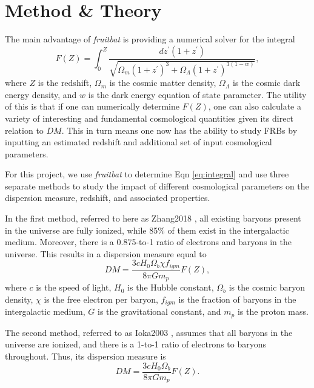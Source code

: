 \documentclass{article}
\begin{document}
\section{Method \& Theory}

The main advantage of {\it fruitbat} is providing a numerical solver for the integral
\begin{equation}
F(Z) = \int_0^Z \frac{dz^{\prime}(1 + z ^\prime )}{\sqrt{\Omega_m(1+z^\prime)^3 + \Omega_{\Lambda} (1+z^\prime)^{3(1-w)}}},
\label{eq:integral}
\end{equation}
where $Z$ is the redshift, $\Omega_m$ is the cosmic matter density, $\Omega_\Lambda$ is the cosmic dark energy density, and $w$ is the dark energy equation of state parameter. The utility of this is that if one can numerically determine $F(Z)$, one can also calculate a variety of interesting and fundamental cosmological quantities given its direct relation to $DM$. This in turn means one now has the ability to study FRBs by inputting an estimated redshift and additional set of input cosmological parameters. 

For this project, we use {\it fruitbat} to determine Eqn \ref{eq:integral} and use three separate methods to study the impact of different cosmological parameters on the dispersion measure, redshift, and associated properties.

In the first method, referred to here as Zhang2018 \cite{Zhang2018}, all existing baryons present in the universe are fully ionized, while 85\% of them exist in the intergalactic medium. Moreover, there is a 0.875-to-1 ratio of electrons and baryons in the universe. This results in a dispersion measure equal to 
\begin{equation}
    DM=\frac{3cH_0\Omega_b\chi f_{igm} }{8\pi G m_p}F(Z),
\end{equation}
where $c$ is the speed of light, $H_0$ is the Hubble constant, $\Omega_b$ is the cosmic baryon density,  $\chi$ is the free electron per baryon, $f_{igm}$ is the fraction of baryons in the intergalactic medium, $G$ is the gravitational constant, and $m_p$ is the proton mass.

The second method, referred to as Ioka2003 \cite{Ioka2003}, assumes that all baryons in the universe are ionized, and there is a 1-to-1 ratio of electrons to baryons throughout. Thus, its dispersion measure is 
\begin{equation}
    DM=\frac{3cH_0 \Omega_b}{8\pi G m_p} F(Z).
\end{equation}
\end{document}
